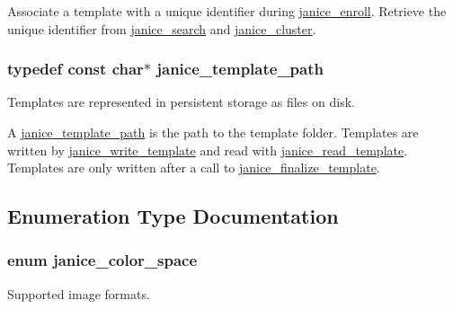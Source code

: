 Associate a template with a unique identifier during \hyperlink{group__janice_ga5ca354538d09d4abf4bd87d34222ecd1}{janice\+\_\+enroll}. Retrieve the unique identifier from \hyperlink{group__janice_ga073aa5f2133223c0b31ac3e78671836a}{janice\+\_\+search} and \hyperlink{group__janice_ga20d0206073850de0224651441c980ee7}{janice\+\_\+cluster}. \hypertarget{group__janice_gafaa1c0182c7a56aaafea6e2bfe471cc8}{}
\subsubsection[{janice\+\_\+template\+\_\+path}]{\setlength{\rightskip}{0pt plus 5cm}typedef const char$\ast$ {\bf janice\+\_\+template\+\_\+path}}\label{group__janice_gafaa1c0182c7a56aaafea6e2bfe471cc8}


Templates are represented in persistent storage as files on disk. 

A \hyperlink{group__janice_gafaa1c0182c7a56aaafea6e2bfe471cc8}{janice\+\_\+template\+\_\+path} is the path to the template folder. Templates are written by \hyperlink{group__janice_ga0d4dbc4c5af8e9be07634e5da920f51b}{janice\+\_\+write\+\_\+template} and read with \hyperlink{group__janice_gace5b3f84daa9349c4557f4e0c8b23a13}{janice\+\_\+read\+\_\+template}. Templates are only written after a call to \hyperlink{group__janice_gaf4894cf8cd61aa1ec60541f11cdb6de8}{janice\+\_\+finalize\+\_\+template}. 

\subsection{Enumeration Type Documentation}
\hypertarget{group__janice_ga4040c8aa81857fc2102f27cf34cd973e}{}
\subsubsection[{janice\+\_\+color\+\_\+space}]{\setlength{\rightskip}{0pt plus 5cm}enum {\bf janice\+\_\+color\+\_\+space}}\label{group__janice_ga4040c8aa81857fc2102f27cf34cd973e}


Supported image formats. 

